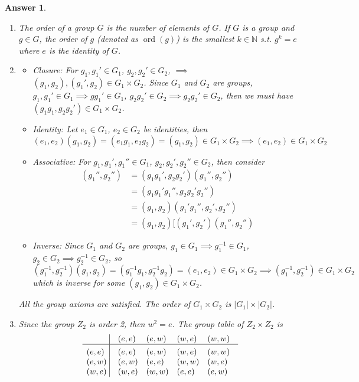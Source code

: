 \documentclass[a4paper]{article}
\DeclareMathOperator{\ord}{ord}
\newtheorem{ans}{Answer}[section]
\theoremstyle{new}
\begin{document}
\begin{ans}\leavevmode
\begin{enumerate}[label=(\roman*)]
\item The order of a group $G$ is the number of elements of $G$. If $G$ is a group and $g\in G$, the order of $g$ (denoted as $\ord(g)$) is the smallest $k\in\mathbb{N}$ s.t. $g^k=e$ where $e$ is the identity of $G$.
\item 
\begin{itemize}
    \item Closure: For $g_1,g_1'\in G_1$, $g_2,g_2'\in G_2$, $\implies$ $(g_1,g_2),(g_1',g_2)\in G_1\times G_2$. Since $G_1$ and $G_2$ are groups, $g_1,g_1'\in G_1\implies gg_1'\in G_1$, $g_2g_2'\in G_2\implies g_2g_2'\in G_2$, then we must have $(g_1g_1,g_2g_2')\in G_1\times G_2$.
    \item Identity: Let $e_1\in G_1$, $e_2\in G_2$ be identities, then 
    $$(e_1,e_2)(g_1,g_2)=(e_1g_1,e_2g_2)=(g_1,g_2)\in G_1\times G_2\implies (e_1,e_2)\in G_1\times G_2$$
    \item Associative: For $g_1,g_1',g_1''\in G_1$, $g_2,g_2',g_2''\in G_2$, then consider
    \begin{align}
    [(g_1,g_2)(g_1',g_2')](g_1'',g_2'')&=(g_1g_1',g_2g_2')(g_1'',g_2'')\nonumber\\&=(g_1g_1'g_1'',g_2g_2'g_2'')\nonumber\\&=(g_1,g_2)(g_1'g_1'',g_2',g_2'')\nonumber\\&=(g_1,g_2)[(g_1',g_2')(g_1'',g_2'')\nonumber
    \end{align}
    \item Inverse: Since $G_1$ and $G_2$ are groups, $g_1\in G_1\implies g_1^{-1}\in G_1$, $g_2\in G_2\implies g_2^{-1}\in G_2$, so 
    $$(g_1^{-1},g_2^{-1})(g_1,g_2)=(g_1^{-1}g_1,g_2^{-1}g_2)=(e_1,e_2)\in G_1\times G_2\implies(g_1^{-1},g_2^{-1})\in G_1\times G_2$$
    which is inverse for some $(g_1,g_2)\in G_1\times G_2$.
\end{itemize}
All the group axioms are satisfied. The order of $G_1\times G_2$ is $|G_1|\times|G_2|$.
\item Since the group $Z_2$ is order 2, then $w^2=e$. The group table of $Z_2\times Z_2$ is
$$\vbox{\tabskip0.5em\offinterlineskip
    \halign{\strut$#$\hfil\ \tabskip1em\vrule&&$#$\hfil\cr
      & (e,e)   & (e,w)  & (w,e) & (w,w)     \cr
    \noalign{\hrule}\vrule height 12pt width 0pt
    (e,e)   & (e,e)   & (e,w)  & (w,e) & (w,w)      \cr
    (e,w)   & (e,w)   & (e,e) & (w,w) & (w,e)      \cr
    (w,e) & (w,e) & (w,w) & (e,e) & (e,w)     \cr
}}$$
\end{enumerate}
\end{ans}
\end{document}
